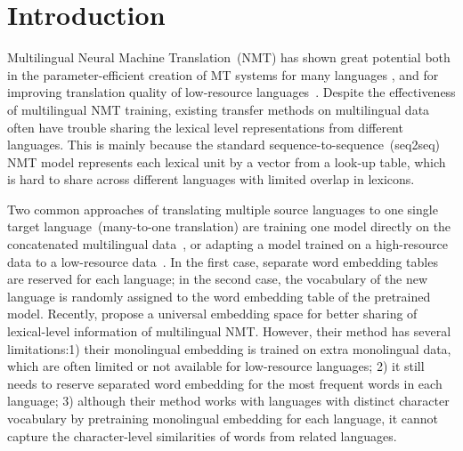 \section{\label{sec:introduction}Introduction}

Multilingual Neural Machine Translation~(NMT) has shown great potential both in the parameter-efficient creation of MT systems for many languages \cite{google_multi_nmt}, and for improving translation quality of low-resource languages~\citep{multi_nmt_adapt,universal_nmt,rapid_adapt_nmt,multi_nmt_shared_attn,multi_nmt_bpe_share}.
Despite the effectiveness of multilingual NMT training, existing transfer methods on multilingual data often have trouble sharing the lexical level representations from different languages.
This is mainly because the standard sequence-to-sequence~(seq2seq) NMT model represents each lexical unit by a vector from a look-up table, which is hard to share across different languages with limited overlap in lexicons.

Two common approaches of translating multiple source languages to one single target language~(many-to-one translation) are training one model directly on the concatenated multilingual data~\citep{rapid_adapt_nmt,google_multi_nmt,multi_nmt_share_enc}, or adapting a model trained on a high-resource data to a low-resource data~\citep{multi_nmt_adapt}. In the first case, separate word embedding tables are reserved for each language; in the second case, the vocabulary of the new language is randomly assigned to the word embedding table of the pretrained model. Recently, \cite{universal_nmt} propose a universal embedding space for better sharing of lexical-level information of multilingual NMT. However, their method has several limitations:1) their monolingual embedding is trained on extra monolingual data, which are often limited or not available for low-resource languages; 2) it still needs to reserve separated word embedding for the most frequent words in each language; 3) although their method works with languages with distinct character vocabulary by pretraining monolingual embedding for each language, it cannot capture the character-level similarities of words from related languages. 


